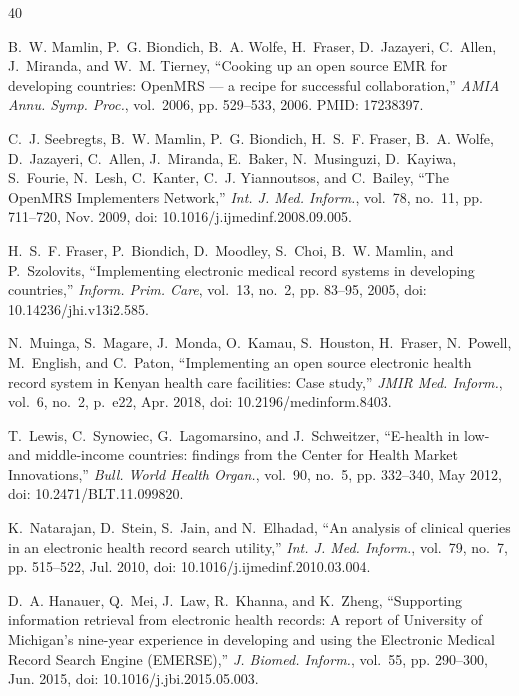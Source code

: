 \documentclass[journal,twoside,web]{ieeecolor}
\begin{document}
\begin{thebibliography}{40}

B.~W. Mamlin, P.~G. Biondich, B.~A. Wolfe, H.~Fraser, D.~Jazayeri, C.~Allen,
J.~Miranda, and W.~M. Tierney, ``Cooking up an open source EMR for developing
countries: OpenMRS --- a recipe for successful collaboration,''
\emph{AMIA Annu. Symp. Proc.}, vol.~2006, pp. 529--533, 2006. PMID: 17238397.

C.~J. Seebregts, B.~W. Mamlin, P.~G. Biondich, H.~S.~F. Fraser, B.~A. Wolfe,
D.~Jazayeri, C.~Allen, J.~Miranda, E.~Baker, N.~Musinguzi, D.~Kayiwa,
S.~Fourie, N.~Lesh, C.~Kanter, C.~J. Yiannoutsos, and C.~Bailey,
``The OpenMRS Implementers Network,'' \emph{Int. J. Med. Inform.}, vol.~78,
no.~11, pp. 711--720, Nov. 2009, doi: 10.1016/j.ijmedinf.2008.09.005.

H.~S.~F. Fraser, P.~Biondich, D.~Moodley, S.~Choi, B.~W. Mamlin, and P.~Szolovits,
``Implementing electronic medical record systems in developing countries,''
\emph{Inform. Prim. Care}, vol.~13, no.~2, pp. 83--95, 2005,
doi: 10.14236/jhi.v13i2.585.

N.~Muinga, S.~Magare, J.~Monda, O.~Kamau, S.~Houston, H.~Fraser, N.~Powell,
M.~English, and C.~Paton, ``Implementing an open source electronic health record
system in Kenyan health care facilities: Case study,'' \emph{JMIR Med. Inform.},
vol.~6, no.~2, p.~e22, Apr. 2018, doi: 10.2196/medinform.8403.

T.~Lewis, C.~Synowiec, G.~Lagomarsino, and J.~Schweitzer, ``E-health in low- and
middle-income countries: findings from the Center for Health Market
Innovations,'' \emph{Bull. World Health Organ.}, vol.~90, no.~5, pp. 332--340,
May 2012, doi: 10.2471/BLT.11.099820.

K.~Natarajan, D.~Stein, S.~Jain, and N.~Elhadad, ``An analysis of clinical
queries in an electronic health record search utility,''
\emph{Int. J. Med. Inform.}, vol.~79, no.~7, pp. 515--522, Jul. 2010,
doi: 10.1016/j.ijmedinf.2010.03.004.

D.~A. Hanauer, Q.~Mei, J.~Law, R.~Khanna, and K.~Zheng, ``Supporting information
retrieval from electronic health records: A report of University of Michigan's
nine-year experience in developing and using the Electronic Medical Record
Search Engine (EMERSE),'' \emph{J. Biomed. Inform.}, vol.~55, pp. 290--300,
Jun. 2015, doi: 10.1016/j.jbi.2015.05.003.


\end{thebibliography}
\end{document}
